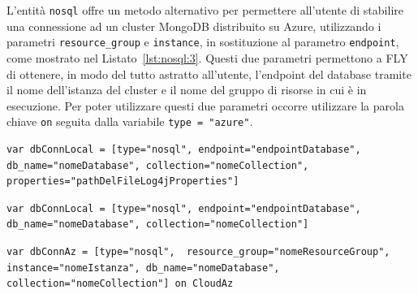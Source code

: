 L'entità \verb|nosql| offre un metodo alternativo per permettere all'utente di stabilire una connessione ad un cluster MongoDB distribuito su Azure, utilizzando i parametri \verb|resource_group| e \verb|instance|, in sostituzione al parametro \verb|endpoint|, come mostrato nel Listato~\ref{lst:nosql:3}. Questi due parametri permettono a FLY di ottenere, in modo del tutto astratto all'utente, l'endpoint del database tramite il nome dell'istanza del cluster e il nome del gruppo di risorse in cui è in esecuzione. Per poter utilizzare questi due parametri occorre utilizzare la parola chiave \verb|on| seguita dalla variabile \verb|type = "azure"|.
\begin{lstlisting}[language=FLY,caption={Dichiarazione di entità nosql che utilizza un file log4j.properties specifico}, label={lst:nosql:1}]
var dbConnLocal = [type="nosql", endpoint="endpointDatabase", db_name="nomeDatabase", collection="nomeCollection", properties="pathDelFileLog4jProperties"]
\end{lstlisting}
\begin{lstlisting}[language=FLY,caption={Dichiarazione di entità nosql per la connesione ad un database tramite l'utilizzo dell'endpoint che utilizza il file log4j.properties generato in automatico da FLY.}, label={lst:nosql:2}]
var dbConnLocal = [type="nosql", endpoint="endpointDatabase", db_name="nomeDatabase", collection="nomeCollection"]
\end{lstlisting}  
\begin{lstlisting}[language=FLY,caption={Dichiarazione di entità nosql per la connessione ad un database distribuito su Azure tramite l'utilizzo dei parametri resource\textunderscore group e instance.}, label={lst:nosql:3}]
var dbConnAz = [type="nosql",  resource_group="nomeResourceGroup", instance="nomeIstanza", db_name="nomeDatabase", collection="nomeCollection"] on CloudAz
\end{lstlisting} 

